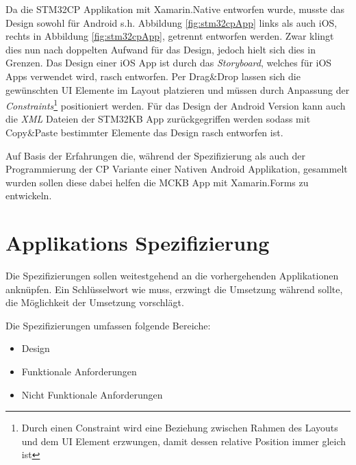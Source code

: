 	Da die STM32CP Applikation mit Xamarin.Native entworfen wurde, musste das Design sowohl für Android s.h. Abbildung \ref{fig:stm32cpApp} links als auch iOS, rechts in Abbildung \ref{fig:stm32cpApp}, getrennt entworfen werden. Zwar klingt dies nun nach doppelten Aufwand für das Design, jedoch hielt sich dies in Grenzen. Das Design einer iOS App ist durch das \textit{Storyboard}, welches für iOS Apps verwendet wird, rasch entworfen. Per Drag\&Drop lassen sich die gewünschten UI Elemente im Layout platzieren und müssen durch Anpassung der \textit{Constraints}\footnote{Durch einen Constraint wird eine Beziehung zwischen Rahmen des Layouts und dem UI Element erzwungen, damit dessen relative Position immer gleich ist} positioniert werden. Für das Design der Android Version kann auch die \textit{XML} Dateien der STM32KB App zurückgegriffen werden sodass mit Copy\&Paste bestimmter Elemente das Design rasch entworfen ist.

	Auf Basis der Erfahrungen die, während der Spezifizierung als auch der Programmierung der CP Variante einer Nativen Android Applikation, gesammelt wurden sollen diese dabei helfen die MCKB App mit Xamarin.Forms zu entwickeln.
	\newpage

\section{Applikations Spezifizierung}
\label{sec:mckspecs}

	Die Spezifizierungen sollen weitestgehend an die vorhergehenden Applikationen anknüpfen. Ein Schlüsselwort wie muss, erzwingt die Umsetzung während sollte, die Möglichkeit der Umsetzung vorschlägt.

	Die Spezifizierungen umfassen folgende Bereiche:
	\begin{itemize}
		\setlength\itemsep{0em}
		\item Design
		\item Funktionale Anforderungen
		\item Nicht Funktionale Anforderungen
	\end{itemize}


